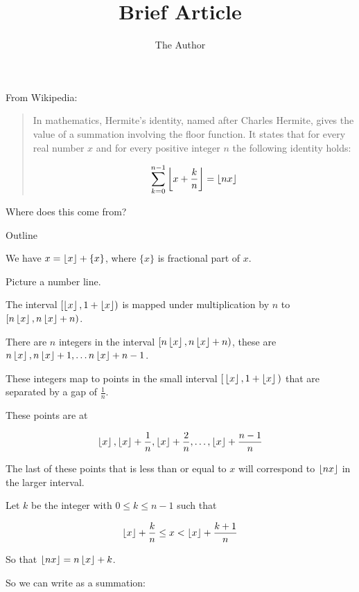 \documentclass[11pt]{amsart}
\title{Brief Article}
\author{The Author}
\begin{document}
\maketitle

From Wikipedia:

\begin{quotation}
In mathematics, Hermite's identity, named after Charles Hermite, gives the value of a summation involving the floor function. It states that for every real number $x$ and for every positive integer $n$ the following identity holds:

$$
\sum_{k=0}^{n-1} \left\lfloor {x+\frac{k}{n}} \right\rfloor = \left\lfloor { nx } \right\rfloor 
$$
\end{quotation}

Where does this come from?

Outline

We have $x =  \left\lfloor {x} \right\rfloor  + \{x\}$, where $\{x\}$ is fractional part of $x$.

Picture a number line.

The interval $[  \left\lfloor { x } \right\rfloor  , 1 +  \left\lfloor { x } \right\rfloor  )$ is mapped under multiplication by $n$ to $[ n  \left\lfloor { x } \right\rfloor  , n  \left\lfloor { x } \right\rfloor  + n )$.

There are $n$ integers in the interval 
$[ n  \left\lfloor { x } \right\rfloor  , n  \left\lfloor { x } \right\rfloor  + n )$, 
these are
$ n  \left\lfloor { x } \right\rfloor  , n  \left\lfloor { x } \right\rfloor  + 1, \ldots n  \left\lfloor { x } \right\rfloor  + n-1 $. 


These integers map to points in the small interval  $[ \,  \left\lfloor { x } \right\rfloor  , 1 +  \left\lfloor { x } \right\rfloor  \, )$ that are separated by a gap of $\frac{1}{n}$.

These points are at 

$$
 \left\lfloor {x} \right\rfloor  ,  \left\lfloor {x} \right\rfloor  + \frac{1}{n},  \left\lfloor {x} \right\rfloor  + \frac{2}{n}, \ldots ,  \left\lfloor {x} \right\rfloor  + \frac{n-1}{n}
$$

The last of these points that is less than or equal to $x$ will correspond to $ \left\lfloor {nx} \right\rfloor $ in the larger interval.

Let $k$ be the integer with $0 \le k \le n-1$ such that

$$
 \left\lfloor {x} \right\rfloor  + \frac{k}{n} \le x <  \left\lfloor {x} \right\rfloor  + \frac{k+1}{n}
$$

So that $ \left\lfloor {nx} \right\rfloor  = n  \left\lfloor {x} \right\rfloor  + k$.


So we can write as a summation:
\end{document}
